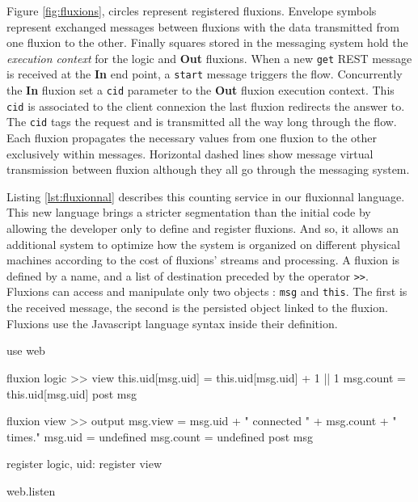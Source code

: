 Figure \ref{fig:fluxions}, circles represent registered fluxions.
Envelope symbols represent exchanged messages between fluxions with the data transmitted from one fluxion to the other. Finally squares stored in the messaging system hold the \textit{execution context} for the logic and \textbf{Out} fluxions.
When a new \texttt{get} REST message is received at the \textbf{In} end point, a \texttt{start} message triggers the flow.
Concurrently the \textbf{In} fluxion set a \texttt{cid} parameter to the \textbf{Out} fluxion execution context.
This \texttt{cid} is associated to the client connexion the last fluxion redirects the answer to.
The \texttt{cid} tags the request and is transmitted all the way long through the flow.
Each fluxion propagates the necessary values from one fluxion to the other exclusively within messages.
Horizontal dashed lines show message virtual transmission between fluxion although they all go through the messaging system.

Listing \ref{lst:fluxionnal} describes this counting service in our fluxionnal language.
This new language brings a stricter segmentation than the initial code by allowing the developer only to define and register fluxions.
And so, it allows an additional system to optimize how the system is organized on different physical machines according to the cost of fluxions' streams and processing.
A fluxion is defined by a name, and a list of destination preceded by the operator \texttt{>}\texttt{>}.
Fluxions can access and manipulate only two objects : \texttt{msg} and \texttt{this}.
The first is the received message, the second is the persisted object linked to the fluxion.
Fluxions use the Javascript language syntax inside their definition.


\begin{code}[Javascript, caption={Fluxionnal sample},label={lst:fluxionnal}]
use web

fluxion logic >> view
  this.uid[msg.uid] = this.uid[msg.uid] + 1 || 1
  msg.count = this.uid[msg.uid]
  post msg

fluxion view >> output
  msg.view = msg.uid + " connected " + msg.count + " times."
  msg.uid = undefined
  msg.count = undefined
  post msg

register logic, {uid: {}}
register view

web.listen
\end{code}

